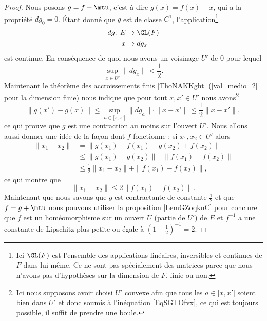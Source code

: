 \begin{proof}
Nous posons \( g=f-\mtu\), c'est à dire \( g(x)=f(x)-x\), qui a la propriété \( dg_0=0\). Étant donné que \( g\) est de classe \( C^1\), l'application\footnote{Ici \( \GL(F)\) est l'ensemble des applications linéaires, inversibles et continues de \( F\) dans lui-même. Ce ne sont pas spécialement des matrices parce que nous n'avons pas d'hypothèses sur la dimension de \( F\), finie ou non.}
    \begin{equation}
        \begin{aligned}
            dg\colon E&\to \GL(F) \\
            x&\mapsto dg_x 
        \end{aligned}
    \end{equation}
    est continue. En conséquence de quoi nous avons un voisinage \( U'\) de \( 0 \) pour lequel
    \begin{equation}    \label{EqSGTOfvx}
        \sup_{x\in U'}\| dg_x \|<\frac{ 1 }{2}.
    \end{equation}
    Maintenant le théorème des accroissements finis \ref{ThoNAKKght} (\ref{val_medio_2} pour la dimension finie) nous indique que pour tout \( x,x'\in U'\) nous avons\footnote{Ici nous supposons avoir choisi \( U'\) convexe afin que tous les \( a\in \mathopen[ x , x' \mathclose]\) soient bien dans \( U'\) et donc soumis à l'inéquation \eqref{EqSGTOfvx}, ce qui est toujours possible, il suffit de prendre une boule.}
    \begin{equation}
        \| g(x')-g(x) \|\leq \sup_{a\in\mathopen[ x , x' \mathclose]}\| dg_a \| \cdot \| x-x' \|\leq \frac{ 1 }{2}\| x-x' \|,
    \end{equation}
    ce qui prouve que \( g\) est une contraction au moins sur l'ouvert \( U'\). Nous allons aussi donner une idée de la façon dont \( f\) fonctionne : si \( x_1,x_2\in U'\) alors
    \begin{subequations}
        \begin{align}
            \| x_1-x_2 \|&=\| g(x_1)-f(x_1)-g(x_2)+f(x_2) \| \\
            &\leq \| g(x_1)-g(x_2) \|+\| f(x_1)-f(x_2) \|\\
            &\leq \frac{ 1 }{2}\| x_1-x_2 \|+\| f(x_1)-f(x_2) \|,
        \end{align}
    \end{subequations}
    ce qui montre que
    \begin{equation}
        \| x_1-x_2 \|\leq 2\| f(x_1)-f(x_2) \|.
    \end{equation}
    Maintenant que nous savons que \( g\) est contractante de constante \( \frac{ 1 }{2}\) et que \( f=g+\mtu\) nous pouvons utiliser la proposition \ref{LemGZoqknC} pour conclure que \( f\) est un homéomorphisme sur un ouvert \( U\) (partie de \( U'\)) de \( E\) et \( f^{-1}\) a une constante de Lipschitz plus petite ou égale à \( (1-\frac{ 1 }{2})^{-1}=2\).


\end{proof}
